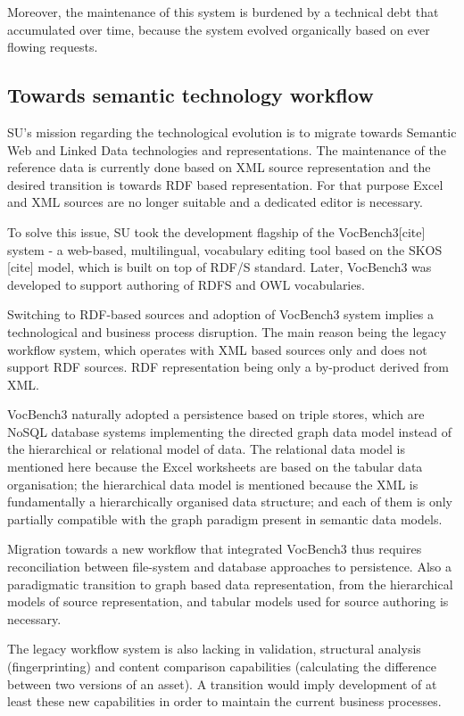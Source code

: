 	Moreover,  the maintenance of this system is burdened by a technical debt that accumulated over time, because the system evolved organically based on ever flowing requests. 
	

	\subsection{Towards semantic technology workflow}
	
	SU's mission regarding the technological evolution is to migrate towards Semantic Web and Linked Data technologies and representations. The maintenance of the reference data is currently done based on XML source representation and the desired transition is towards RDF based representation. For that purpose Excel and XML sources are no longer suitable and a dedicated editor is necessary.
	
	To solve this issue, SU took the development flagship of the VocBench3[cite] system - a web-based, multilingual, vocabulary editing tool based on the SKOS [cite] model, which is built on top of RDF/S standard. Later, VocBench3 was developed to support authoring of RDFS and OWL vocabularies.
	
	Switching to RDF-based sources and adoption of VocBench3 system implies a technological and business process disruption. The main reason being the legacy workflow system, which operates with XML based sources only and does not support RDF sources. RDF representation being only a by-product derived from XML. 
	
	VocBench3 naturally adopted a persistence based on triple stores, which are NoSQL database systems implementing the directed graph data model instead of the hierarchical or relational model of data. The relational data model is mentioned here because the Excel worksheets are based on the tabular data organisation; the hierarchical data model is mentioned because the XML is fundamentally a hierarchically organised data structure; and each of them is only partially compatible with the graph paradigm present in semantic data models. 
	
	Migration towards a new workflow that integrated VocBench3 thus requires reconciliation between file-system and database approaches to persistence. Also a paradigmatic transition to graph based data representation, from the hierarchical models of source representation, and tabular models used for source authoring is necessary.
	 
	The legacy workflow system is also lacking in validation, structural analysis (fingerprinting) and content comparison capabilities (calculating the difference between two versions of an asset). A transition would imply development of at least these new capabilities in order to maintain the current business processes. 
	